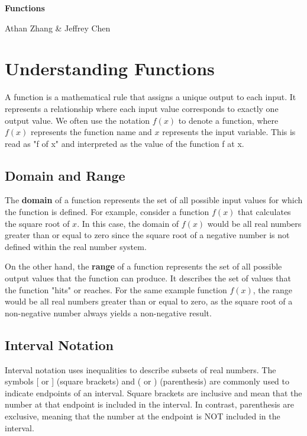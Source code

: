 \documentclass[11pt]{article}
\begin{document}
\textbf{\Huge Functions}

Athan Zhang \& Jeffrey Chen

\section{Understanding Functions}

A function is a mathematical rule that assigns a unique output to each input. It represents a relationship where each input value corresponds to exactly one output value. We often use the notation $f(x)$ to denote a function, where $f(x)$ represents the function name and $x$ represents the input variable. This is read as "f of x" and interpreted as the value of the function f at x.

\subsection{Domain and Range}

The \textbf{domain} of a function represents the set of all possible input values for which the function is defined. For example, consider a function $f(x)$ that calculates the square root of $x$. In this case, the domain of $f(x)$ would be all real numbers greater than or equal to zero since the square root of a negative number is not defined within the real number system.

On the other hand, the \textbf{range} of a function represents the set of all possible output values that the function can produce. It describes the set of values that the function "hits" or reaches. For the same example function $f(x)$, the range would be all real numbers greater than or equal to zero, as the square root of a non-negative number always yields a non-negative result.

\subsection{Interval Notation}

Interval notation uses inequalities to describe subsets of real numbers. The symbols [ or ] (square brackets) and ( or ) (parenthesis) are commonly used to indicate endpoints of an interval. Square brackets are inclusive and mean that the number at that endpoint is included in the interval. In contrast, parenthesis are exclusive, meaning that the number at the endpoint is NOT included in the interval.
\end{document}
